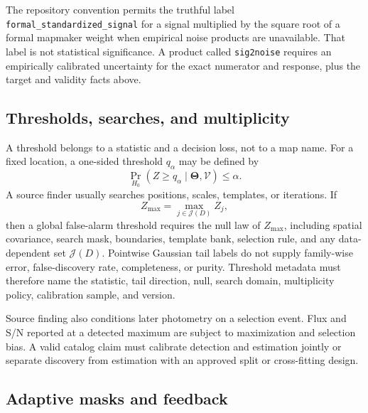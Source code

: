 \documentclass[11pt]{article}
\newcommand{\ThetaV}{\boldsymbol{\Theta}}
\begin{document}
The repository convention permits the truthful label
\texttt{formal\_standardized\_signal} for a signal multiplied by the square
root of a formal mapmaker weight when empirical noise products are unavailable.
That label is not statistical significance.  A product called
\texttt{sig2noise} requires an empirically calibrated uncertainty for the
exact numerator and response, plus the target and validity facts above.

\subsection{Thresholds, searches, and multiplicity}

A threshold belongs to a statistic and a decision loss, not to a map name.
For a fixed location, a one-sided threshold $q_\alpha$ may be defined by
\begin{equation}
  \Pr_{H_0}(Z\ge q_\alpha\mid\ThetaV,\mathcal V)\le\alpha.
  \label{eq:pointwise-threshold}
\end{equation}
A source finder usually searches positions, scales, templates, or iterations.
If
\begin{equation}
  Z_{\max}=\max_{j\in\mathcal J(D)}Z_j,
  \label{eq:search-maximum}
\end{equation}
then a global false-alarm threshold requires the null law of $Z_{\max}$,
including spatial covariance, search mask, boundaries, template bank,
selection rule, and any data-dependent set $\mathcal J(D)$.  Pointwise
Gaussian tail labels do not supply family-wise error, false-discovery rate,
completeness, or purity.  Threshold metadata must therefore name the statistic,
tail direction, null, search domain, multiplicity policy, calibration sample,
and version.

Source finding also conditions later photometry on a selection event.  Flux
and S/N reported at a detected maximum are subject to maximization and
selection bias.  A valid catalog claim must calibrate detection and estimation
jointly or separate discovery from estimation with an approved split or
cross-fitting design.

\subsection{Adaptive masks and feedback}
\end{document}
